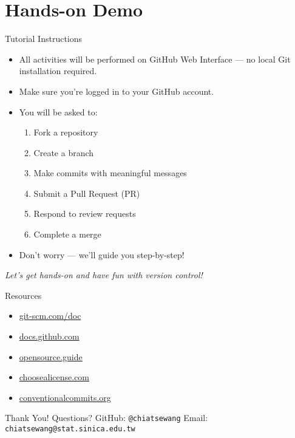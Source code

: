 \documentclass[12pt]{beamer}
\begin{document}
\section{Hands-on Demo}
\begin{frame}{Tutorial Instructions}
    \begin{itemize}
        \item All activities will be performed on GitHub Web Interface — no local Git installation required.
        \item Make sure you're logged in to your GitHub account.
        \item You will be asked to:
        \begin{enumerate}
            \item Fork a repository
            \item Create a branch
            \item Make commits with meaningful messages
            \item Submit a Pull Request (PR)
            \item Respond to review requests
            \item Complete a merge
        \end{enumerate}
        \item Don’t worry — we’ll guide you step-by-step!
    \end{itemize}
    
    \vspace{1em}
    \centering
    \textit{Let’s get hands-on and have fun with version control!}
\end{frame}






\begin{frame}{Resources}
  \begin{itemize}
    \setlenght\itemsep{1em}
    \item \href{https://git-scm.com/doc}{git-scm.com/doc}
    \item \href{https://docs.github.com}{docs.github.com}
    \item \href{https://opensource.guide/}{opensource.guide}
    \item \href{https://choosealicense.com}{choosealicense.com}
    \item \href{https://www.conventionalcommits.org/en/v1.0.0/}{conventionalcommits.org}
  \end{itemize}
\end{frame}

\begin{frame}{Thank You!}
  Questions? \newline
  \small GitHub: \texttt{@chiatsewang} \quad Email: \texttt{chiatsewang@stat.sinica.edu.tw}
\end{frame}
\end{document}
